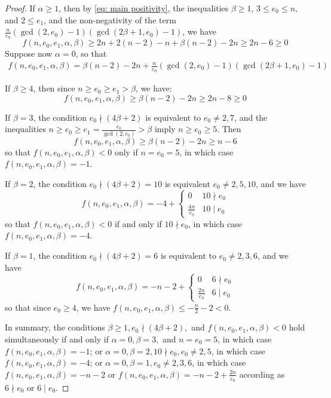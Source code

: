\documentclass[12pt]{amsart}
\numberwithin{equation}{section}
\theoremstyle{definition}
\begin{document}
\begin{proof}
    If $\alpha\geq 1$, then by \eqref{eq: main positivity}, the inequalities $\beta\geq1$, $3\leq e_0\leq n$, and $2\leq e_1$, and the non-negativity of the term $\frac{n}{e_0}(\gcd(2,e_0)-1)(\gcd(2\beta+1,e_0)-1)$, we have
    \[f(n,e_0,e_1,\alpha,\beta)\geq2n+2(n-2)-n+\beta(n-2)-2n\geq 2n-6\geq0\]
    Suppose now $\alpha=0$, so that 
    \begin{align*}
    f(n,e_0,e_1,\alpha,\beta)=\beta(n-2)-2n+\frac{n}{e_0}(\gcd(2,e_0)-1)(\gcd(2\beta+1,e_0)-1)
    \end{align*}
    
    If $\beta\geq 4$, then since $n\geq e_0\geq e_1>\beta$, we have:
    \[f(n,e_0,e_1,\alpha,\beta)\geq \beta(n-2)-2n\geq 2n-8\geq0\]

    If $\beta=3$, the condition $e_0\nmid (4\beta+2)$ is equivalent to $e_0\neq 2,7$, and the inequalities $n\geq e_0\geq e_1=\frac{e_0}{\gcd(2,e_0)}>\beta$ imply $n\geq e_0\geq 5$. Then 
    \[f(n,e_0,e_1,\alpha,\beta)\geq\beta(n-2)-2n\geq n-6\]
    so that $f(n,e_0,e_1,\alpha,\beta)<0$ only if $n=e_0=5$, in which case $f(n,e_0,e_1,\alpha,\beta)=-1$.

    If $\beta=2$, the condition $e_0\nmid (4\beta+2)=10$ is equivalent $e_0\neq 2,5,10$, and we have
    \[f(n,e_0,e_1,\alpha,\beta)=-4+\begin{cases}
        0&10\nmid e_0\\
        \frac{4n}{e_0}&10\mid e_0
    \end{cases}\]
    so that $f(n,e_0,e_1,\alpha,\beta)<0$
    if and only if $10\nmid e_0$, in which case $f(n,e_0,e_1,\alpha,\beta)=-4$.

    If $\beta=1$, the condition $e_0\nmid (4\beta+2)=6$ is equivalent to $e_0\neq 2,3,6$, and we have
    \[f(n,e_0,e_1,\alpha,\beta)=-n-2+\begin{cases}
        0&6\nmid e_0\\
        \frac{2n}{e_0}&6\mid e_0
    \end{cases}\]
    so that since $e_0\geq 4$, we have $f(n,e_0,e_1,\alpha,\beta)\leq -\frac{n}{2}-2<0$.
    
    In summary, the conditions $\beta\geq1,e_0\nmid (4\beta+2),$ and $f(n,e_0,e_1,\alpha,\beta)<0$ hold simultaneously if and only if $\alpha=0,\beta=3,$ and $n=e_0=5$, in which case $f(n,e_0,e_1,\alpha,\beta)=-1$; or $\alpha=0,\beta=2,10\nmid e_0,e_0\neq 2,5$, in which case $f(n,e_0,e_1,\alpha,\beta)=-4$; or $\alpha=0,\beta=1,e_0\neq 2,3,6$, in which case $f(n,e_0,e_1,\alpha,\beta)=-n-2$ or $f(n,e_0,e_1,\alpha,\beta)=-n-2+\frac{2n}{e_0}$ according as $6\nmid e_0$ or $6\mid e_0$.
\end{proof}
\end{document}
